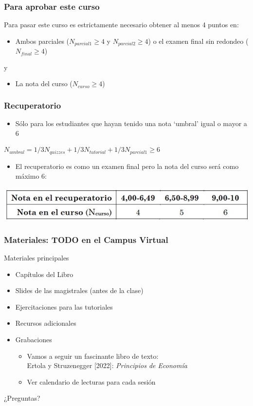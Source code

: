 \documentclass{beamer}
\begin{document}
\begin{frame}
\frametitle{Para aprobar este curso}
Para pasar este curso es estrictamente necesario obtener al menos 4 puntos en:
\vspace{2mm}
\begin{itemize}
    \item Ambos parciales ($N_{parcial 1} \geq 4$ y $N_{parcial 2} \geq 4$) o el examen final sin redondeo ($N_{final} \geq 4$)
\end{itemize}
\centering y
\vspace{2mm}
\begin{itemize}
    \item La nota del curso ($N_{curso} \geq 4$)
\end{itemize}
\end{frame}

\begin{frame}
\frametitle{Recuperatorio}
\begin{itemize}
    \item Sólo para los estudiantes que hayan tenido una nota ‘umbral’ igual o mayor a 6
\end{itemize}
    \begin{center}
        $N_{umbral}=1/3N_{quizzes}+1/3N_{tutorial}+1/3N_{parcial 1} \geq 6$
    \end{center}
    
\begin{itemize}
    \item El recuperatorio es como un examen final pero la nota del curso será como máximo 6:
\end{itemize}
\centering
\includegraphics[scale=0.6]{Slides Principios de Economia/Figures/notarecup.jpg}
\end{frame}

\begin{frame}
\frametitle{Materiales: TODO en el Campus Virtual}
Materiales principales
\begin{itemize}
    \item Capítulos del Libro
    \item Slides de las magistrales (antes de la clase)
    \item Ejercitaciones para las tutoriales
    \item Recursos adicionales
    \item Grabaciones
    \begin{itemize}
        \item Vamos a seguir un fascinante libro de texto: \\
        Ertola y Struzenegger [2022]:  \textit{Principios de Economía}
        \item Ver calendario de lecturas para cada sesión
        \end{itemize}
\end{itemize}
\end{frame}


\begin{frame}
\begin{center}
    \Huge ¿Preguntas?
\end{center}
\end{frame}
\end{document}
